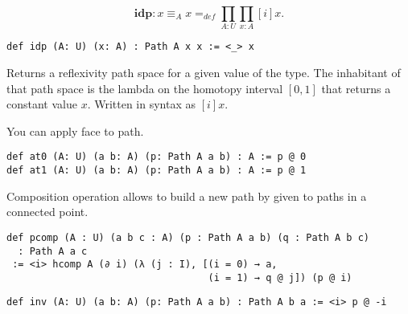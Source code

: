 \documentclass{article}
\begin{document}
\begin{definition}
$$
   \mathbf{idp} : x \equiv_A x =_{def} \prod_{A:U}\prod_{x:A} [i] x.
$$
\begin{lstlisting}[mathescape=true]
def idp (A: U) (x: A) : Path A x x := <_> x
\end{lstlisting}
Returns a reflexivity path space for a given value of the type.
The inhabitant of that path space is the lambda on the homotopy
interval $[0,1]$ that returns a constant value $x$. Written in
syntax as $[i]x$.
\end{definition}

\begin{definition}
You can apply face to path.
\begin{lstlisting}
def at0 (A: U) (a b: A) (p: Path A a b) : A := p @ 0
def at1 (A: U) (a b: A) (p: Path A a b) : A := p @ 1
\end{lstlisting}
\end{definition}

\begin{definition}
Composition operation allows to build a new path by given to paths
in a connected point.
\begin{center}
\end{center}
\begin{lstlisting}[mathescape=true]
def pcomp (A : U) (a b c : A) (p : Path A a b) (q : Path A b c)
  : Path A a c
 := <i> hcomp A (∂ i) (λ (j : I), [(i = 0) → a,
                                   (i = 1) → q @ j]) (p @ i)
\end{lstlisting}
\end{definition}

\begin{theorem} \indent
\begin{lstlisting}[mathescape=true]
def inv (A: U) (a b: A) (p: Path A a b) : Path A b a := <i> p @ -i
\end{lstlisting}
\end{theorem}
\end{document}

